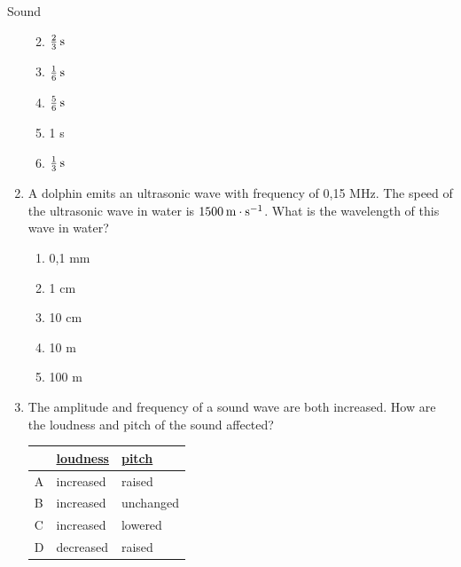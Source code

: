 \begin{eocexercises}{Sound}
\begin{enumerate}[noitemsep, label=\textbf{\arabic*}. ]
\begin{enumerate}[noitemsep, label=\textbf{\alph*}. ]
            \label{m38800*uid54}\item $\frac{2}{3}\phantom{\rule{2pt}{0ex}}\text{s}$
\label{m38800*uid55}\item $\frac{1}{6}\phantom{\rule{2pt}{0ex}}\text{s}$
\label{m38800*uid56}\item $\frac{5}{6}\phantom{\rule{2pt}{0ex}}\text{s}$
\label{m38800*uid57}\item 1 s
\label{m38800*uid58}\item $\frac{1}{3}\phantom{\rule{2pt}{0ex}}\text{s}$
\end{enumerate}
                \label{m38800*uid59}\item A dolphin emits an ultrasonic wave with frequency of 0,15 MHz. The speed of the ultrasonic wave in water is $1 500\phantom{\rule{2pt}{0ex}}\text{m}\ensuremath{\cdot}\text{s}{}^{-1}$. What is the wavelength of this wave in water?
\label{m38800*id186650}\begin{enumerate}[noitemsep, label=\textbf{\alph*}. ] 
            \label{m38800*uid60}\item 0,1 mm
\label{m38800*uid61}\item 1 cm
\label{m38800*uid62}\item 10 cm
\label{m38800*uid63}\item 10 m
\label{m38800*uid64}\item 100 m
\end{enumerate}
                \label{m38800*uid65}\item The amplitude and frequency of a sound wave are both increased. How are the loudness and pitch of the sound affected?
          \begin{table}[H]
        \begin{center}
      \label{m38800*id186726}
    \noindent
      \begin{tabular}{|l|l|l|}\hline
         &
        \uline{loudness} &
        \uline{pitch} \\ \hline
        A &
        increased &
        raised \\ \hline
        B &
        increased &
        unchanged \\ \hline
        C &
        increased &
        lowered \\ \hline
        D &
        decreased &
        raised \\ \hline

\end{tabular}
\end{center}
\end{table}
\end{enumerate}
\end{eocexercises}
